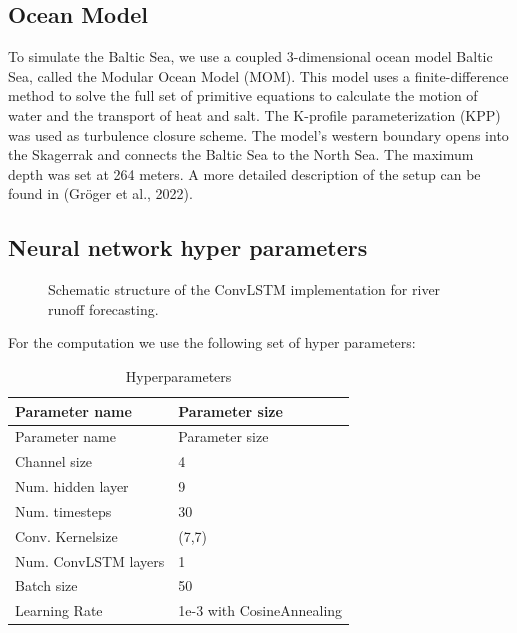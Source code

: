 \documentclass[
]{agujournal2019}
\begin{document}
\subsection{Ocean Model}\label{ocean-model}

To simulate the Baltic Sea, we use a coupled 3-dimensional ocean model
Baltic Sea, called the Modular Ocean Model (MOM). This model uses a
finite-difference method to solve the full set of primitive equations to
calculate the motion of water and the transport of heat and salt. The
K-profile parameterization (KPP) was used as turbulence closure scheme.
The model's western boundary opens into the Skagerrak and connects the
Baltic Sea to the North Sea. The maximum depth was set at 264 meters. A
more detailed description of the setup can be found in (Gröger et al.,
2022).

\subsection{Neural network hyper
parameters}\label{neural-network-hyper-parameters}

\begin{figure}


\caption{\label{fig-baltNet}Schematic structure of the ConvLSTM
implementation for river runoff forecasting.}

\end{figure}%

For the computation we use the following set of hyper parameters:

\begin{longtable}[]{@{}ll@{}}
\caption{Hyperparameters}\label{tbl-letters}\tabularnewline
\toprule\noalign{}
Parameter name & Parameter size \\
\midrule\noalign{}
\endfirsthead
\toprule\noalign{}
Parameter name & Parameter size \\
\midrule\noalign{}
\endhead
\bottomrule\noalign{}
\endlastfoot
Channel size & 4 \\
Num. hidden layer & 9 \\
Num. timesteps & 30 \\
Conv. Kernelsize & (7,7) \\
Num. ConvLSTM layers & 1 \\
Batch size & 50 \\
Learning Rate & 1e-3 with CosineAnnealing \\
\end{longtable}
\end{document}
